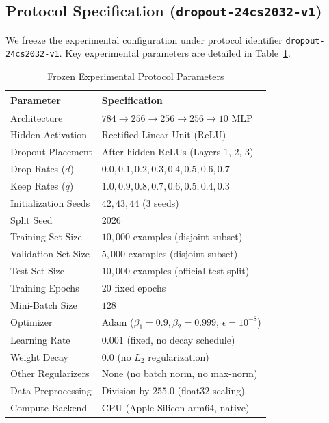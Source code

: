 \documentclass[conference]{IEEEtran}
\begin{document}
\subsection{Protocol Specification (\texttt{dropout-24cs2032-v1})}
We freeze the experimental configuration under protocol identifier \texttt{dropout-24cs2032-v1}. Key experimental parameters are detailed in Table~\ref{tab:protocol}.

\begin{table}[htbp]
\caption{Frozen Experimental Protocol Parameters}
\label{tab:protocol}
\centering
\setlength{\tabcolsep}{4pt}
\begin{tabular}{ll}
\toprule
\textbf{Parameter} & \textbf{Specification} \\
\midrule
Architecture & $784 \to 256 \to 256 \to 256 \to 10$ MLP \\
Hidden Activation & Rectified Linear Unit (ReLU) \\
Dropout Placement & After hidden ReLUs (Layers 1, 2, 3) \\
Drop Rates ($d$) & $0.0, 0.1, 0.2, 0.3, 0.4, 0.5, 0.6, 0.7$ \\
Keep Rates ($q$) & $1.0, 0.9, 0.8, 0.7, 0.6, 0.5, 0.4, 0.3$ \\
Initialization Seeds & $42, 43, 44$ (3 seeds) \\
Split Seed & $2026$ \\
Training Set Size & $10{,}000$ examples (disjoint subset) \\
Validation Set Size & $5{,}000$ examples (disjoint subset) \\
Test Set Size & $10{,}000$ examples (official test split) \\
Training Epochs & $20$ fixed epochs \\
Mini-Batch Size & $128$ \\
Optimizer & Adam ($\beta_1=0.9, \beta_2=0.999$, $\epsilon=10^{-8}$) \\
Learning Rate & $0.001$ (fixed, no decay schedule) \\
Weight Decay & $0.0$ (no $L_2$ regularization) \\
Other Regularizers & None (no batch norm, no max-norm) \\
Data Preprocessing & Division by $255.0$ (float32 scaling) \\
Compute Backend & CPU (Apple Silicon arm64, native) \\
\bottomrule
\end{tabular}
\end{table}
\end{document}
